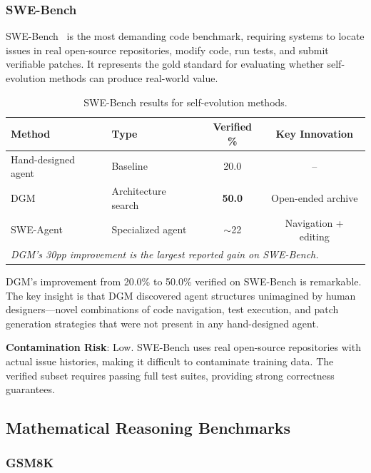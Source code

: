 \subsubsection{SWE-Bench}

SWE-Bench~\citep{jimenez2024swebench} is the most demanding code benchmark, requiring systems to locate issues in real open-source repositories, modify code, run tests, and submit verifiable patches. It represents the gold standard for evaluating whether self-evolution methods can produce real-world value.

\begin{table}[htbp]
\centering
\caption{SWE-Bench results for self-evolution methods.}
\label{tab:swebench-results}
\begin{tabular}{llcc}
\toprule
\textbf{Method} & \textbf{Type} & \textbf{Verified \%} & \textbf{Key Innovation} \\
\midrule
Hand-designed agent & Baseline & 20.0 & -- \\
DGM & Architecture search & \textbf{50.0} & Open-ended archive \\
SWE-Agent & Specialized agent & $\sim$22 & Navigation + editing \\
\midrule
\multicolumn{4}{l}{\textit{DGM's 30pp improvement is the largest reported gain on SWE-Bench.}} \\
\bottomrule
\end{tabular}
\end{table}

DGM's improvement from 20.0\% to 50.0\% verified on SWE-Bench is remarkable. The key insight is that DGM discovered agent structures unimagined by human designers---novel combinations of code navigation, test execution, and patch generation strategies that were not present in any hand-designed agent.

\textbf{Contamination Risk}: Low. SWE-Bench uses real open-source repositories with actual issue histories, making it difficult to contaminate training data. The verified subset requires passing full test suites, providing strong correctness guarantees.

\subsection{Mathematical Reasoning Benchmarks}\label{sec:ch5-math}

\subsubsection{GSM8K}

